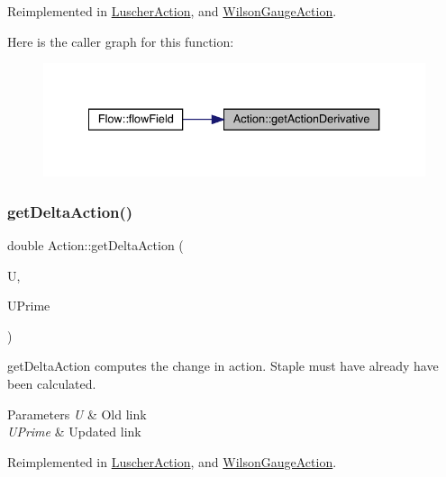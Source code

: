 Reimplemented in \mbox{\hyperlink{class_luscher_action_ac11785b2df276816a098a87e6ac514c7}{Luscher\+Action}}, and \mbox{\hyperlink{class_wilson_gauge_action_a43cf939cd53495b7225fbeaa8a0ff6e8}{Wilson\+Gauge\+Action}}.

Here is the caller graph for this function\+:\nopagebreak
\begin{figure}[H]
\begin{center}
\leavevmode
\includegraphics[width=334pt]{class_action_a78168dd7c3819a3365e28fc1aae1b9b6_icgraph}
\end{center}
\end{figure}
\mbox{\label{class_action_a9409aad86cbfe3b6ec25bf5a837eaea5}} 
\subsubsection{\texorpdfstring{getDeltaAction()}{getDeltaAction()}}
{\footnotesize\ttfamily double Action\+::get\+Delta\+Action (\begin{DoxyParamCaption}\item[{\mbox{\hyperlink{class_s_u3}{S\+U3}}}]{U,  }\item[{\mbox{\hyperlink{class_s_u3}{S\+U3}}}]{U\+Prime }\end{DoxyParamCaption})\hspace{0.3cm}{\ttfamily [virtual]}}



get\+Delta\+Action computes the change in action. Staple must have already have been calculated. 


\begin{DoxyParams}{Parameters}
{\em U} & Old link \\
\hline
{\em U\+Prime} & Updated link \\
\hline
\end{DoxyParams}


Reimplemented in \mbox{\hyperlink{class_luscher_action_a1955f8eea8b0771f6c737c39e3fc11b2}{Luscher\+Action}}, and \mbox{\hyperlink{class_wilson_gauge_action_a60f2892e61489004df3cde6cc856b00b}{Wilson\+Gauge\+Action}}.



